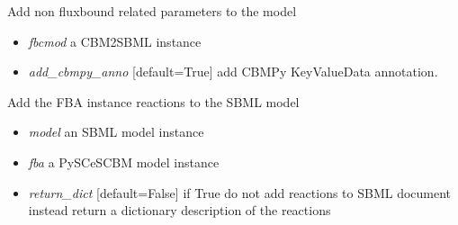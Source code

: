 \documentclass[a4paper,11pt,english]{sphinxmanual}
\begin{document}

\begin{fulllineitems}
\label{modules_doc:cbmpy.CBXML.sbml_setParametersL3Fbc}
Add non fluxbound related parameters to the model
\begin{itemize}
\item {} 
\emph{fbcmod} a CBM2SBML instance

\item {} 
\emph{add\_cbmpy\_anno} {[}default=True{]} add CBMPy KeyValueData annotation.

\end{itemize}

\end{fulllineitems}


\begin{fulllineitems}
\label{modules_doc:cbmpy.CBXML.sbml_setReactionsL2}
Add the FBA instance reactions to the SBML model
\begin{itemize}
\item {} 
\emph{model} an SBML model instance

\item {} 
\emph{fba} a PySCeSCBM model instance

\item {} 
\emph{return\_dict} {[}default=False{]} if True do not add reactions to SBML document instead return a dictionary description of the reactions

\end{itemize}

\end{fulllineitems}

\end{document}
